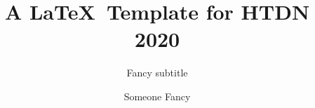 \documentclass[10pt,sigconf]{acmart}
\begin{document}
\title{A \LaTeX\ Template for HTDN 2020}

\subtitle{Fancy subtitle}
 \author{Someone Fancy}


\begin{abstract}
    \blindtext
\end{abstract}

\maketitle





\end{document}
